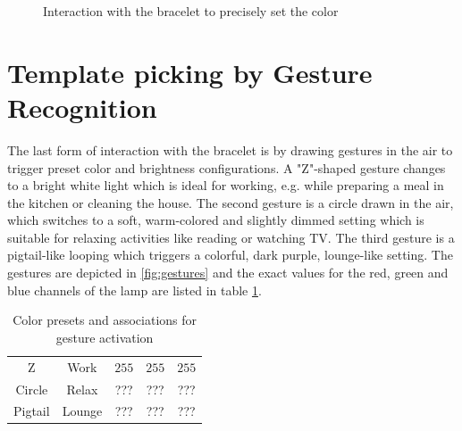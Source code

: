 \begin{figure}[bth]
	\myfloatalign
	 \quad
	\caption{Interaction with the bracelet to precisely set the color} \label{fig:hslinteraction}
\end{figure}

\section{Template picking by Gesture Recognition}
The last form of interaction with the bracelet is by drawing gestures in the air to trigger preset color and brightness configurations. A "Z"-shaped gesture changes to a bright white light which is ideal for working, e.g. while preparing a meal in the kitchen or cleaning the house. The second gesture is a circle drawn in the air, which switches to a soft, warm-colored and slightly dimmed setting which is suitable for relaxing activities like reading or watching TV. The third gesture is a pigtail-like looping which triggers a colorful, dark purple, lounge-like setting. The gestures are depicted in \ref{fig:gestures} and the exact values for the red, green and blue channels of the lamp are listed in table \ref{tab:colors}.

\begin{table}
	\myfloatalign
	\begin{tabularx}{.8\textwidth}{ccccc}
		\toprule
		\tableheadline{Gesture} & \tableheadline{Association} & \tableheadline{Red} & \tableheadline{Green} & \tableheadline{Blue}\\ 
		\midrule
		Z & Work & $ 255 $ & $ 255 $ & $ 255 $\\
		Circle & Relax & ??? & ??? & ???\\
		Pigtail & Lounge & ??? & ??? & ???\\
		\bottomrule
	\end{tabularx}
	\caption[Color presets for gesture activation]{Color presets and associations for gesture activation}  \label{tab:colors}
\end{table}

